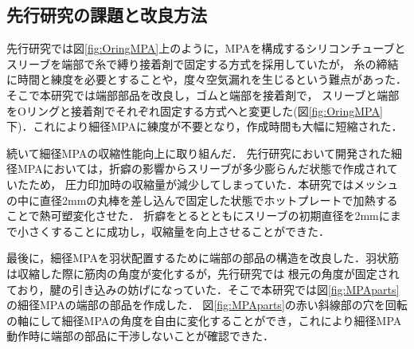 \documentclass{jarticle}
\begin{document}
\subsection{先行研究の課題と改良方法}

先行研究では図\ref{fig:OringMPA}上のように，MPAを構成するシリコンチューブとスリーブを端部で糸で縛り接着剤で固定する方式を採用していたが，
糸の締結に時間と練度を必要とすることや，度々空気漏れを生じるという難点があった．そこで本研究では端部部品を改良し，ゴムと端部を接着剤で，
スリーブと端部をOリングと接着剤でそれぞれ固定する方式へと変更した(図\ref{fig:OringMPA}下)．これにより細径MPAに練度が不要となり，作成時間も大幅に短縮された．

続いて細径MPAの収縮性能向上に取り組んだ．
先行研究において開発された細径MPAにおいては，折癖の影響からスリーブが多少膨らんだ状態で作成されていたため，
圧力印加時の収縮量が減少してしまっていた．本研究ではメッシュの中に直径2mmの丸棒を差し込んで固定した状態でホットプレートで加熱することで熱可塑変化させた．
折癖をとるとともにスリーブの初期直径を2mmにまで小さくすることに成功し，収縮量を向上させることができた．

最後に，細径MPAを羽状配置するために端部の部品の構造を改良した．羽状筋は収縮した際に筋肉の角度が変化するが，先行研究では
根元の角度が固定されており，腱の引き込みの妨げになっていた．そこで本研究では図\ref{fig:MPAparts}の細径MPAの端部の部品を作成した．
図\ref{fig:MPAparts}の赤い斜線部の穴を回転の軸にして細径MPAの角度を自由に変化することができ，これにより細径MPA動作時に端部の部品に干渉しないことが確認できた．
\end{document}
